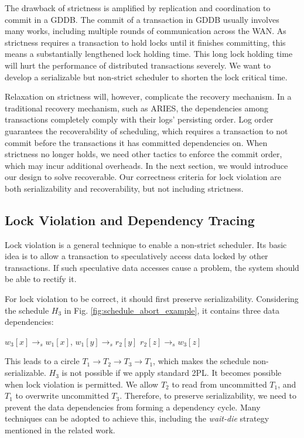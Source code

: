\documentclass[conference]{IEEEtran}
\begin{document}
The drawback of strictness is amplified by replication and coordination to commit in a GDDB.
The commit of a transaction in GDDB usually involves many works, including multiple rounds of communication across the WAN.
As strictness requires a transaction to hold locks until it finishes committing, this means a substantially lengthened lock holding time. 
This long lock holding time will hurt the performance of distributed transactions severely.
We want to develop a serializable but non-strict scheduler to shorten the lock critical time.

Relaxation on strictness will, however, complicate the recovery mechanism.
In a traditional recovery mechanism, such as ARIES, the dependencies among transactions completely comply with their logs' persisting order. 
Log order guarantees the recoverability of scheduling, which requires a transaction to not commit before the transactions it has committed dependencies on.
When strictness no longer holds, we need other tactics to enforce the commit order, which may incur additional overheads.
In the next section, we would introduce our design to solve recoverable.
Our correctness criteria for lock violation are both serializability and recoverability, but not including strictness.

\subsection{Lock Violation and Dependency Tracing}

Lock violation is a general technique to enable a non-strict scheduler.
Its basic idea is to allow a transaction to speculatively access data locked by other transactions.
If such speculative data accesses cause a problem, the system should be able to rectify it.

For lock violation to be correct, it should first preserve serializability.
Considering the schedule ${H_3}$ in Fig. \ref{fig:schedule_abort_example},
it contains three data dependencies:

\begin{center}
${w_3[x] \rightarrow _s w_1[x]}$,
${w_1[y] \rightarrow _s r_2[y]}$
${r_2[z] \rightarrow _s w_3[z]}$
\end{center}

This leads to a circle ${T_1 \rightarrow T_2 \rightarrow T_3 \rightarrow T_1}$, which makes the schedule non-serializable.
${H_3}$ is not possible if we apply standard 2PL. 
It becomes possible when lock violation is permitted.
We allow ${T_2}$ to read from uncommitted ${T_1}$, and ${T_1}$ to overwrite uncommitted ${T_3}$.
Therefore, to preserve serializability, we need to prevent the data dependencies from forming a dependency cycle.
Many techniques can be adopted to achieve this, including the \emph{wait-die} strategy mentioned in the related work.
\end{document}
